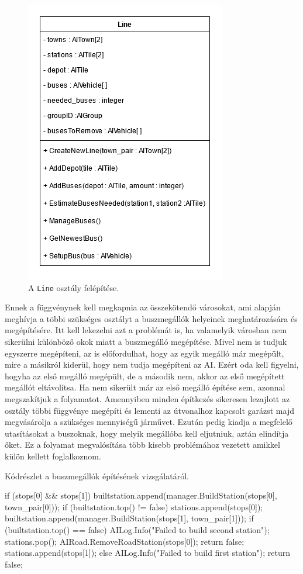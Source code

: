\begin{figure}
	\centering
	\includegraphics[scale=0.5]{images/line.png}
	\caption{A \texttt{Line} osztály felépítése.}
	\label{fig:line}
\end{figure}

Ennek a függvénynek kell megkapnia az összekötendő városokat, ami alapján meghívja a többi szükséges osztályt a buszmegállók helyeinek meghatározására és megépítésére. Itt kell lekezelni azt a problémát is, ha valamelyik városban nem sikerülni különböző okok miatt a buszmegálló megépítése. Mivel nem is tudjuk egyszerre megépíteni, az is előfordulhat, hogy az egyik megálló már megépült, mire a másikról kiderül, hogy nem tudja megépíteni az AI. Ezért oda kell figyelni, hogyha az első megálló megépült, de a második nem, akkor az első megépített megállót eltávolítsa. Ha nem sikerült már az első megálló építése sem, azonnal megszakítjuk a folyamatot. Amennyiben minden építkezés sikeresen lezajlott az osztály többi függvénye megépíti és lementi az útvonalhoz kapcsolt garázst majd megvásárolja a szükséges mennyiségű járművet. Ezután pedig kiadja a megfelelő utasításokat a buszoknak, hogy melyik megállóba kell eljutniuk, aztán elindítja őket. Ez a folyamat megvalósítása több kisebb problémához vezetett amikkel külön kellett foglalkoznom.

Kódrészlet a buszmegállók építésének vizsgálatáról.
\begin{cpp}
if (stops[0] && stops[1]) {
  builtstation.append(manager.BuildStation(stops[0], town_pair[0]));
  if (builtstation.top() != false) {
    stations.append(stops[0]);
    builtstation.append(manager.BuildStation(stops[1], town_pair[1]));
    if (builtstation.top() == false) {
      AILog.Info("Failed to build second station");
      stations.pop();
      AIRoad.RemoveRoadStation(stops[0]);
      return false;
    }
    stations.append(stops[1]);
  } else {
    AILog.Info("Failed to build first station");
    return false;
  }
} 
\end{cpp}

